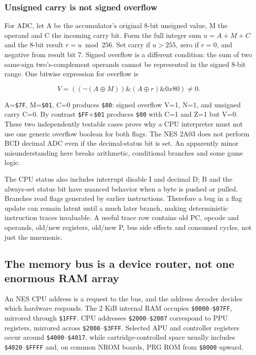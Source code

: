 \subsubsection{Unsigned carry is not signed overflow}\label{unsigned-carry-is-not-signed-overflow}

For ADC, let A be the accumulator's original 8-bit unsigned value, M the operand and C the incoming carry bit. Form the full integer sum \(u=A+M+C\) and the 8-bit result \(r=u\bmod256\). Set carry if \(u>255\), zero if \(r=0\), and negative from result bit 7. Signed overflow is a different condition: the sum of two same-sign two's-complement operands cannot be represented in the signed 8-bit range. One bitwise expression for overflow is

\[
V= ((\neg(A\oplus M))\mathbin{\&}(A\oplus r)\mathbin{\&}0x80)\ne0.
\]

A=\texttt{\$7F}, M=\texttt{\$01}, C=0 produces \texttt{\$80}: signed overflow V=1, N=1, and unsigned carry C=0. By contrast \texttt{\$FF}+\texttt{\$01} produces \texttt{\$00} with C=1 and Z=1 but V=0. These two independently testable cases prove why a CPU interpreter must not use one generic overflow boolean for both flags. The NES 2A03 does not perform BCD decimal ADC even if the decimal-status bit is set. An apparently minor misunderstanding here breaks arithmetic, conditional branches and some game logic.

The CPU status also includes interrupt disable I and decimal D; B and the always-set status bit have nuanced behavior when a byte is pushed or pulled. Branches read flags generated by earlier instructions. Therefore a bug in a flag update can remain latent until a much later branch, making deterministic instruction traces invaluable. A useful trace row contains old PC, opcode and operands, old/new registers, old/new P, bus side effects and consumed cycles, not just the mnemonic.

\subsection{The memory bus is a device router, not one enormous RAM array}\label{the-memory-bus-is-a-device-router-not-one-enormous-ram-array}

An NES CPU address is a request to the bus, and the address decoder decides which hardware responds. The 2 KiB internal RAM occupies \texttt{\$0000}--\texttt{\$07FF}, mirrored through \texttt{\$1FFF}. CPU addresses \texttt{\$2000}--\texttt{\$2007} correspond to PPU registers, mirrored across \texttt{\$2008}--\texttt{\$3FFF}. Selected APU and controller registers occur around \texttt{\$4000}--\texttt{\$4017}, while cartridge-controlled space usually includes \texttt{\$4020}--\texttt{\$FFFF} and, on common NROM boards, PRG ROM from \texttt{\$8000} upward.

